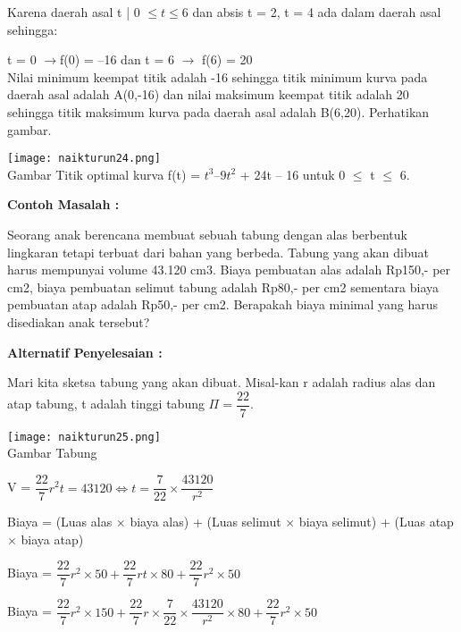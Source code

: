 \documentclass[11pt,fleqn]{book} %
\begin{document}
Karena daerah asal {t | 0 $\leq t \leq $6} dan absis t = 2, t = 4 ada dalam daerah asal sehingga:

t = 0 $\rightarrow $f(0) = –16 dan t = 6 $\rightarrow$ f(6) = 20\\

Nilai minimum keempat titik adalah -16 sehingga titik
minimum kurva pada daerah asal adalah A(0,-16) dan
nilai maksimum keempat titik adalah 20 sehingga titik
maksimum kurva pada daerah asal adalah B(6,20).
Perhatikan gambar.

\begin{center}
\texttt{[image: naikturun24.png]}\\
Gambar Titik optimal kurva f(t) = $t^{3} – 9t^{2}$ + 24t – 16
untuk 0 $\leq$ t $\leq$ 6.
\end{center}

\begin{flushleft}
\textbf{Contoh Masalah :}
\end{flushleft}

Seorang anak berencana membuat sebuah tabung
dengan alas berbentuk lingkaran tetapi terbuat dari
bahan yang berbeda. Tabung yang akan dibuat harus
mempunyai volume 43.120 cm3. Biaya pembuatan
alas adalah Rp150,- per cm2, biaya pembuatan
selimut tabung adalah Rp80,- per cm2 sementara
biaya pembuatan atap adalah Rp50,- per cm2.
Berapakah biaya minimal yang harus disediakan
anak tersebut?

\begin{flushleft}
\textbf{Alternatif Penyelesaian :}
\end{flushleft}

Mari kita sketsa tabung yang akan dibuat. Misal-kan r
adalah radius alas dan atap tabung, t adalah tinggi tabung $\Pi = \dfrac{22}{7}$.

\begin{center}
\texttt{[image: naikturun25.png]}\\
Gambar Tabung
\end{center}

V = $\dfrac{22}{7}r^{2}t = 43120 \Leftrightarrow t = \dfrac{7}{22} \times \dfrac{43120}{r^{2}}$

Biaya = (Luas alas $\times$ biaya alas) + (Luas selimut $\times$ biaya selimut) + (Luas atap $\times$ biaya atap)

Biaya =
$\dfrac{22}{7}r^{2} \times 50 + \dfrac{22}{7}rt \times 80 + \dfrac{22}{7}r^{2} \times 50$

Biaya =
$\dfrac{22}{7}r^{2} \times 150 + \dfrac{22}{7}r \times \dfrac{7}{22} \times \dfrac{43120}{r^{2}} \times 80 + \dfrac{22}{7}r^{2} \times 50$
\end{document}
